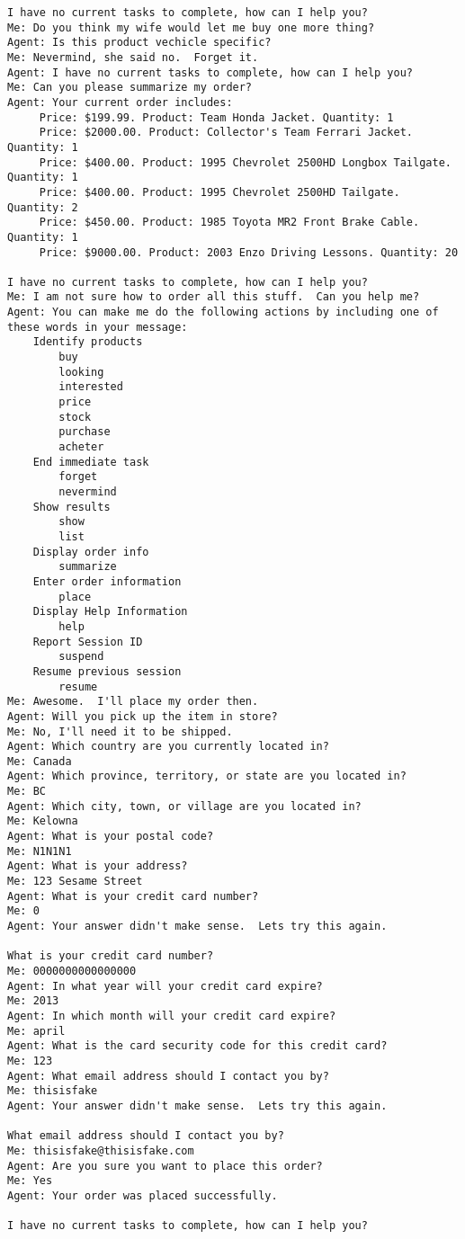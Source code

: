 \documentclass[11pt, titlepage]{article}
\begin{document}
\begin{lstlisting}
I have no current tasks to complete, how can I help you?
Me: Do you think my wife would let me buy one more thing?
Agent: Is this product vechicle specific?
Me: Nevermind, she said no.  Forget it.
Agent: I have no current tasks to complete, how can I help you?
Me: Can you please summarize my order?
Agent: Your current order includes:
	 Price: $199.99. Product: Team Honda Jacket. Quantity: 1
	 Price: $2000.00. Product: Collector's Team Ferrari Jacket. Quantity: 1
	 Price: $400.00. Product: 1995 Chevrolet 2500HD Longbox Tailgate. Quantity: 1
	 Price: $400.00. Product: 1995 Chevrolet 2500HD Tailgate. Quantity: 2
	 Price: $450.00. Product: 1985 Toyota MR2 Front Brake Cable. Quantity: 1
	 Price: $9000.00. Product: 2003 Enzo Driving Lessons. Quantity: 20

I have no current tasks to complete, how can I help you?
Me: I am not sure how to order all this stuff.  Can you help me?
Agent: You can make me do the following actions by including one of these words in your message:
	Identify products
		buy
		looking
		interested
		price
		stock
		purchase
		acheter
	End immediate task
		forget
		nevermind
	Show results
		show
		list
	Display order info
		summarize
	Enter order information
		place
	Display Help Information
		help
	Report Session ID
		suspend
	Resume previous session
		resume
Me: Awesome.  I'll place my order then.
Agent: Will you pick up the item in store?
Me: No, I'll need it to be shipped.
Agent: Which country are you currently located in?
Me: Canada
Agent: Which province, territory, or state are you located in?
Me: BC
Agent: Which city, town, or village are you located in?
Me: Kelowna
Agent: What is your postal code?
Me: N1N1N1
Agent: What is your address?
Me: 123 Sesame Street
Agent: What is your credit card number?
Me: 0
Agent: Your answer didn't make sense.  Lets try this again.

What is your credit card number?
Me: 0000000000000000
Agent: In what year will your credit card expire?
Me: 2013
Agent: In which month will your credit card expire?
Me: april
Agent: What is the card security code for this credit card?
Me: 123
Agent: What email address should I contact you by?
Me: thisisfake
Agent: Your answer didn't make sense.  Lets try this again.

What email address should I contact you by?
Me: thisisfake@thisisfake.com
Agent: Are you sure you want to place this order?
Me: Yes
Agent: Your order was placed successfully.

I have no current tasks to complete, how can I help you?
\end{lstlisting}
\end{document}
